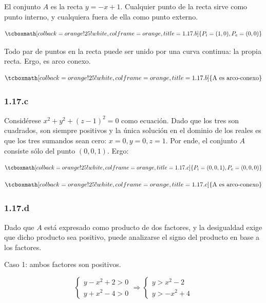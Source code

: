 \documentclass{article}
\begin{document}
El conjunto $A$ es la recta $y = -x + 1$. Cualquier punto de la recta sirve como punto interno, y cualquiera fuera de ella como punto externo.

\begin{equation}
\tcboxmath[colback=orange!25!white,colframe=orange,title=1.17.b]
{
P_i = (1, 0), P_e = (0, 0)
}
\end{equation}

Todo par de puntos en la recta puede ser unido por una curva continua: la propia recta. Ergo, es arco conexo.

\begin{equation}
\tcboxmath[colback=orange!25!white,colframe=orange,title=1.17.b]
{ \text{A es arco-conexo} }
\end{equation}

\subsubsection*{1.17.c}
\label{subsubsec:1.17.c}

Considérese $x^2 + y^2 + (z-1)^2 = 0$ como ecuación. Dado que los tres son cuadrados, son siempre positivos y la única solución en el dominio de los reales es que los tres sumandos sean cero: $x = 0, y = 0, z = 1$. Por ende, el conjunto $A$ consiste sólo del punto $(0, 0, 1)$. Ergo:

\begin{equation}
\tcboxmath[colback=orange!25!white,colframe=orange,title=1.17.c]
{
P_i = (0, 0, 1), P_e = (0, 0, 0)
}
\end{equation}

\begin{equation}
\tcboxmath[colback=orange!25!white,colframe=orange,title=1.17.c]
{ \text{A es arco-conexo} }
\end{equation}

\subsubsection*{1.17.d}
\label{subsubsec:1.17.d}

Dado que $A$ está expresado como producto de dos factores, y la desigualdad exige que dicho producto sea positivo, puede analizarse el signo del producto en base a los factores.

Caso 1: ambos factores son positivos.

\begin{equation}
\left\{ \begin{array}{ll}
y - x^2 + 2 > 0 \\
y + x^2 -4 > 0
\end{array}
\right. \Rightarrow \left\{ \begin{array}{ll}
y > x^2 - 2 \\
y > -x^2 + 4
\end{array}
\right.
\end{equation}
\end{document}
